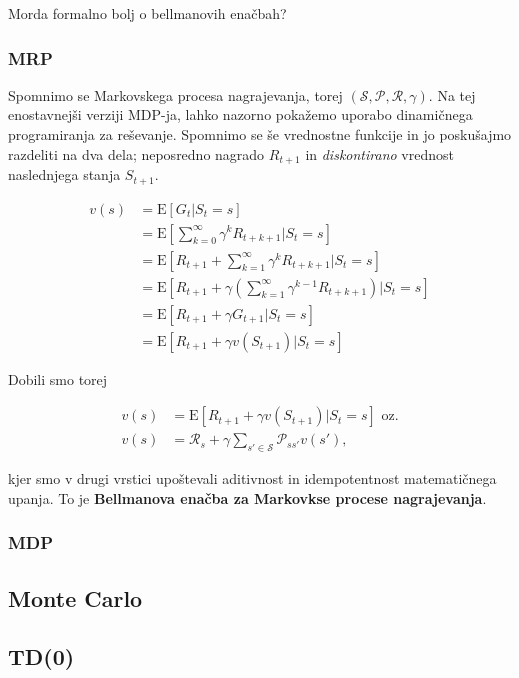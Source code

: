 \documentclass[12pt,a4paper]{amsart}
\theoremstyle{definition} %
\theoremstyle{plain} %
\begin{document}
Morda formalno bolj o bellmanovih enačbah?

\subsubsection{MRP}
Spomnimo se Markovskega procesa nagrajevanja, torej $(\mathcal{S}, \mathcal{P}, \mathcal{R}, 
\gamma)$. Na tej enostavnejši verziji MDP-ja, lahko nazorno pokažemo uporabo dinamičnega
programiranja za reševanje. Spomnimo se še vrednostne funkcije in jo poskušajmo razdeliti na
dva dela; neposredno nagrado $R_{t+1}$ in \textit{diskontirano} vrednost naslednjega stanja
$S_{t+1}$.

\begin{align*}
    v(s) &= \mathrm{E} [G_t | S_t = s] \\
         &= \mathrm{E} [\sum_{k=0}^\infty \gamma^k R_{t + k + 1} | S_t = s] \\
         &= \mathrm{E} [R_{t+1} + \sum_{k=1}^\infty \gamma^k R_{t + k + 1} | S_t = s] \\
         &= \mathrm{E} [R_{t+1} + \gamma(\sum_{k=1}^\infty \gamma^{k-1} R_{t + k + 1}) | S_t = s] \\
         &= \mathrm{E} [R_{t+1} + \gamma G_{t+1} | S_t = s] \\
         &= \mathrm{E} [R_{t+1} + \gamma v(S_{t+1}) | S_t = s]
\end{align*}

Dobili smo torej 

\begin{align}
    v(s) &= \mathrm{E} [R_{t+1} + \gamma v(S_{t+1}) | S_t = s] \text{ oz.} \\
    v(s) &= \mathcal{R}_s + \gamma \sum_{s' \in \mathcal{S}} \mathcal{P}_{ss'} v(s'),
\end{align}

kjer smo v drugi vrstici upoštevali aditivnost in idempotentnost matematičnega upanja. To je 
\textbf{Bellmanova enačba za Markovkse procese nagrajevanja}.

\subsubsection{MDP}

\subsection{Monte Carlo}
\subsection{TD(0)}
\end{document}
